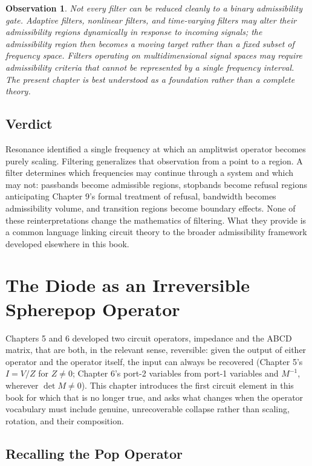 \documentclass[12pt]{article}
\newtheorem{observation}{Observation}
\begin{document}
\begin{observation}
Not every filter can be reduced cleanly to a binary admissibility gate. Adaptive filters, nonlinear filters, and time-varying filters may alter their admissibility regions dynamically in response to incoming signals; the admissibility region then becomes a moving target rather than a fixed subset of frequency space. Filters operating on multidimensional signal spaces may require admissibility criteria that cannot be represented by a single frequency interval. The present chapter is best understood as a foundation rather than a complete theory.
\end{observation}

\subsection{Verdict}

Resonance identified a single frequency at which an amplitwist operator becomes purely scaling. Filtering generalizes that observation from a point to a region. A filter determines which frequencies may continue through a system and which may not: passbands become admissible regions, stopbands become refusal regions anticipating Chapter 9's formal treatment of refusal, bandwidth becomes admissibility volume, and transition regions become boundary effects. None of these reinterpretations change the mathematics of filtering. What they provide is a common language linking circuit theory to the broader admissibility framework developed elsewhere in this book.

\section{The Diode as an Irreversible Spherepop Operator}

Chapters 5 and 6 developed two circuit operators, impedance and the ABCD matrix, that are both, in the relevant sense, reversible: given the output of either operator and the operator itself, the input can always be recovered (Chapter 5's $I = V/Z$ for $Z \neq 0$; Chapter 6's port-2 variables from port-1 variables and $M^{-1}$, wherever $\det M \neq 0$). This chapter introduces the first circuit element in this book for which that is no longer true, and asks what changes when the operator vocabulary must include genuine, unrecoverable collapse rather than scaling, rotation, and their composition.

\subsection{Recalling the Pop Operator}
\end{document}
